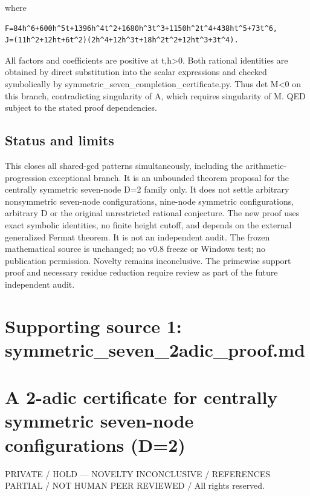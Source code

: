 \documentclass[
  10pt,
]{article}
\begin{document}
where

\begin{verbatim}
F=84h^6+600h^5t+1396h^4t^2+1680h^3t^3+1150h^2t^4+438ht^5+73t^6,
J=(11h^2+12ht+6t^2)(2h^4+12h^3t+18h^2t^2+12ht^3+3t^4).
\end{verbatim}

All factors and coefficients are positive at t,h\textgreater0. Both
rational identities are obtained by direct substitution into the scalar
expressions and checked symbolically by
symmetric\_seven\_completion\_certificate.py. Thus det M\textless0 on
this branch, contradicting singularity of A, which requires singularity
of M. QED subject to the stated proof dependencies.

\subsection{Status and limits}\label{status-and-limits}

This closes all shared-gcd patterns simultaneously, including the
arithmetic-progression exceptional branch. It is an unbounded theorem
proposal for the centrally symmetric seven-node D=2 family only. It does
not settle arbitrary nonsymmetric seven-node configurations, nine-node
symmetric configurations, arbitrary D or the original unrestricted
rational conjecture. The new proof uses exact symbolic identities, no
finite height cutoff, and depends on the external generalized Fermat
theorem. It is not an independent audit. The frozen mathematical source
is unchanged; no v0.8 freeze or Windows test; no publication permission.
Novelty remains inconclusive. The primewise support proof and necessary
residue reduction require review as part of the future independent
audit.

\newpage

\section{Supporting source 1:
symmetric\_seven\_2adic\_proof.md}\label{supporting-source-1-symmetric_seven_2adic_proof.md}

\section{A 2-adic certificate for centrally symmetric seven-node
configurations
(D=2)}\label{a-2-adic-certificate-for-centrally-symmetric-seven-node-configurations-d2}

PRIVATE / HOLD --- NOVELTY INCONCLUSIVE / REFERENCES PARTIAL / NOT HUMAN
PEER REVIEWED / All rights reserved.
\end{document}
